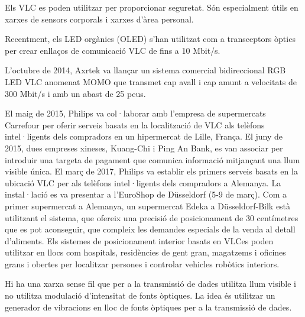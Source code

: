Els VLC es poden utilitzar per proporcionar seguretat. Són especialment útils en xarxes de sensors corporals i xarxes d'àrea personal.

Recentment, els LED orgànics (OLED) s'han utilitzat com a transceptors òptics per crear enllaços de comunicació VLC de fins a 10 Mbit/s.

L'octubre de 2014, Axrtek va llançar un sistema comercial bidireccional RGB LED VLC anomenat MOMO que transmet cap avall i cap amunt a velocitats de 300 Mbit/s i amb un abast de 25 peus.

El maig de 2015, Philips va col·laborar amb l'empresa de supermercats Carrefour per oferir serveis basats en la localització de VLC als telèfons intel·ligents dels compradors en un hipermercat de Lille, França. El juny de 2015, dues empreses xineses, Kuang-Chi i Ping An Bank, es van associar per introduir una targeta de pagament que comunica informació mitjançant una llum visible única. El març de 2017, Philips va establir els primers serveis basats en la ubicació VLC per als telèfons intel·ligents dels compradors a Alemanya. La instal·lació es va presentar a l'EuroShop de Düsseldorf (5-9 de març). Com a primer supermercat a Alemanya, un supermercat Edeka a Düsseldorf-Bilk està utilitzant el sistema, que ofereix una precisió de posicionament de 30 centímetres que es pot aconseguir, que compleix les demandes especials de la venda al detall d'aliments. Els sistemes de posicionament interior basats en VLCes poden utilitzar en llocs com hospitals, residències de gent gran, magatzems i oficines grans i obertes per localitzar persones i controlar vehicles robòtics interiors.

Hi ha una xarxa sense fil que per a la transmissió de dades utilitza llum visible i no utilitza modulació d'intensitat de fonts òptiques. La idea és utilitzar un generador de vibracions en lloc de fonts òptiques per a la transmissió de dades.